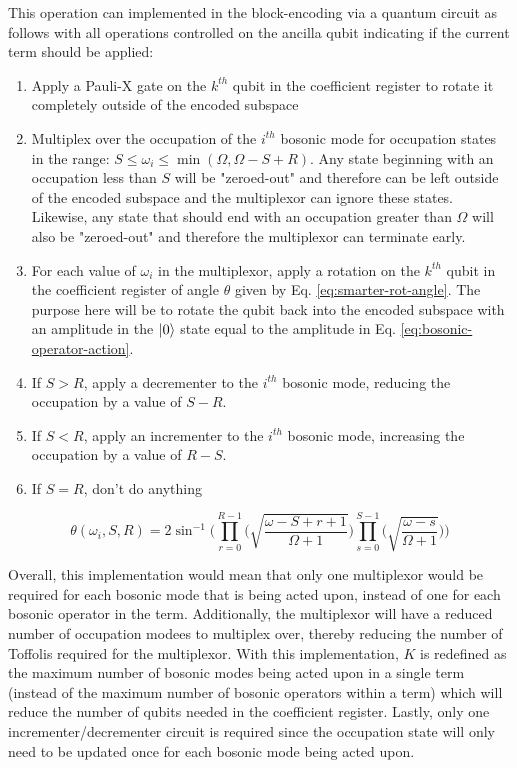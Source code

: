 \begin{tcolorbox}
    This operation can implemented in the block-encoding via a quantum circuit as follows with all operations controlled on the ancilla qubit indicating if the current term should be applied:
    \begin{enumerate}
        \item Apply a Pauli-X gate on the $k^{th}$ qubit in the coefficient register to rotate it completely outside of the encoded subspace
        \item Multiplex over the occupation of the $i^{th}$ bosonic mode for occupation states in the range: $S \leq \omega_i \leq \min(\Omega, \Omega - S + R)$. Any state beginning with an occupation less than $S$ will be "zeroed-out" and therefore can be left outside of the encoded subspace and the multiplexor can ignore these states. Likewise, any state that should end with an occupation greater than $\Omega$ will also be "zeroed-out" and therefore the multiplexor can terminate early.
        \item For each value of $\omega_i$ in the multiplexor, apply a rotation on the $k^{th}$ qubit in the coefficient register of angle $\theta$ given by Eq. \ref{eq:smarter-rot-angle}. The purpose here will be to rotate the qubit back into the encoded subspace with an amplitude in the $\ket{0}$ state equal to the amplitude in Eq. \ref{eq:bosonic-operator-action}. 
        \item If $S > R$, apply a decrementer to the $i^{th}$ bosonic mode, reducing the occupation by a value of $S - R$.
        \item If $S < R$, apply an incrementer to the $i^{th}$ bosonic mode, increasing the occupation by a value of $R - S$.
        \item If $S = R$, don't do anything
    \end{enumerate}

    \begin{equation}
        \label{eq:smarter-rot-angle}
        \theta(\omega_i, S, R) = 2 \sin^{-1}{\Big(\prod_{r=0}^{R-1} \big( \sqrt{\frac{\omega - S + r + 1}{\Omega + 1}} \big) \prod_{s=0}^{S-1} \big( \sqrt{\frac{\omega - s}{\Omega + 1}} \big)\Big)}
    \end{equation}

    Overall, this implementation would mean that only one multiplexor would be required for each bosonic mode that is being acted upon, instead of one for each bosonic operator in the term.
    Additionally, the multiplexor will have a reduced number of occupation modees to multiplex over, thereby reducing the number of Toffolis required for the multiplexor.
    With this implementation, $K$ is redefined as the maximum number of bosonic modes being acted upon in a single term (instead of the maximum number of bosonic operators within a term) which will reduce the number of qubits needed in the coefficient register.
    Lastly, only one incrementer/decrementer circuit is required since the occupation state will only need to be updated once for each bosonic mode being acted upon.
\end{tcolorbox}

